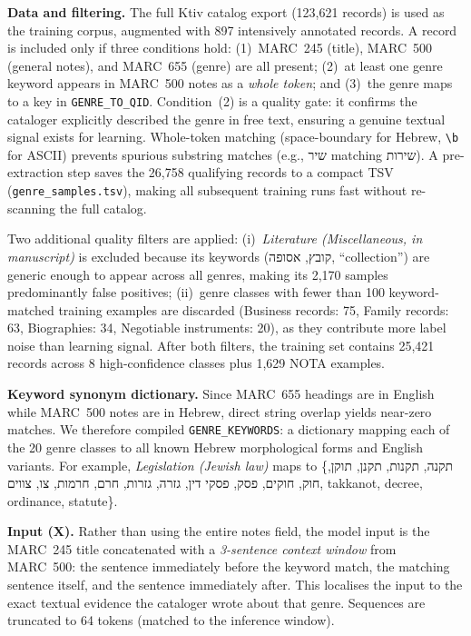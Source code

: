 \documentclass[Afour,sageh,times]{sagej}
\newcommand{\texthebrew}[1]{{\hebrewfont #1}}
\begin{document}
\textbf{Data and filtering.} The full Ktiv catalog export (123,621 records) is used as the training corpus, augmented with 897 intensively annotated records. A record is included only if three conditions hold: (1)~MARC~245 (title), MARC~500 (general notes), and MARC~655 (genre) are all present; (2)~at least one genre keyword appears in MARC~500 notes as a \emph{whole token}; and (3)~the genre maps to a key in \texttt{GENRE\_TO\_QID}. Condition~(2) is a quality gate: it confirms the cataloger explicitly described the genre in free text, ensuring a genuine textual signal exists for learning. Whole-token matching (space-boundary for Hebrew, \texttt{\textbackslash b} for ASCII) prevents spurious substring matches (e.g., \texthebrew{שיר} matching \texthebrew{שירות}). A pre-extraction step saves the 26,758 qualifying records to a compact TSV (\texttt{genre\_samples.tsv}), making all subsequent training runs fast without re-scanning the full catalog.

Two additional quality filters are applied: (i)~\emph{Literature (Miscellaneous, in manuscript)} is excluded because its keywords (\texthebrew{קובץ}, \texthebrew{אסופה}, ``collection'') are generic enough to appear across all genres, making its 2,170 samples predominantly false positives; (ii)~genre classes with fewer than 100 keyword-matched training examples are discarded (Business records: 75, Family records: 63, Biographies: 34, Negotiable instruments: 20), as they contribute more label noise than learning signal. After both filters, the training set contains 25,421 records across 8 high-confidence classes plus 1,629 NOTA examples.

\textbf{Keyword synonym dictionary.} Since MARC~655 headings are in English while MARC~500 notes are in Hebrew, direct string overlap yields near-zero matches. We therefore compiled \texttt{GENRE\_KEYWORDS}: a dictionary mapping each of the 20 genre classes to all known Hebrew morphological forms and English variants. For example, \emph{Legislation (Jewish law)} maps to \{תקנה, תקנות, תקנן, תוקן, חוק, חוקים, פסק, פסקי דין, גזרה, גזרות, חרם, חרמות, צו, צווים, takkanot, decree, ordinance, statute\}.

\textbf{Input (X).} Rather than using the entire notes field, the model input is the MARC~245 title concatenated with a \emph{3-sentence context window} from MARC~500: the sentence immediately before the keyword match, the matching sentence itself, and the sentence immediately after. This localises the input to the exact textual evidence the cataloger wrote about that genre. Sequences are truncated to 64 tokens (matched to the inference window).
\end{document}
